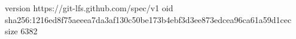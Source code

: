 version https://git-lfs.github.com/spec/v1
oid sha256:1216ed8f75aeeea7da3af130c50be173b4ebf3d3ee873edcea96ca61a59d1cec
size 6382
